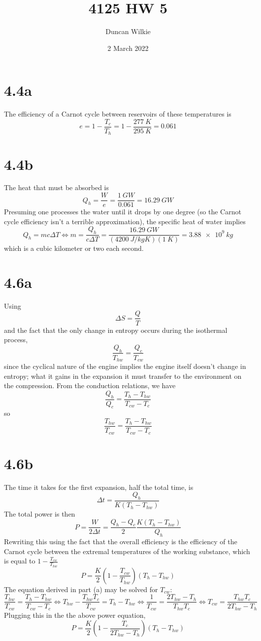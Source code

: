 \documentclass{article}
\title{4125 HW 5}
\author{Duncan Wilkie}
\date{2 March 2022}
\begin{document}
\maketitle
\section*{4.4a}
The efficiency of a Carnot cycle between reservoirs of these temperatures is
\[e=1-\frac{T_{c}}{T_{h}}=1-\frac{\SI{277}{K}}{\SI{295}{K}}=0.061\]

\section*{4.4b}
The heat that must be absorbed is
\[Q_{h}=\frac{W}{e}=\frac{\SI{1}{GW}}{0.061}=\SI{16.29}{GW}\]
Presuming one processes the water until it drops by one degree (so the Carnot cycle efficiency isn't a terrible approximation), the specific heat of water implies
\[Q_{h}=mc\Delta T\Leftrightarrow m=\frac{Q_{h}}{c\Delta T}=\frac{\SI{16.29}{GW}}{(\SI{4200}{J/kg K})(\SI{1}{K})}=\SI{3.88e9}{kg}\]
which is a cubic kilometer or two each second.

\section*{4.6a}
Using
\[\Delta S=\frac{Q}{T}\]
and the fact that the only change in entropy occurs during the isothermal process,
\[\frac{Q_{h}}{T_{hw}}=\frac{Q_{c}}{T_{cw}}\]
since the cyclical nature of the engine implies the engine itself doesn't change in entropy; what it gains in the expansion it must transfer to the environment on the compression.
From the conduction relations, we have
\[\frac{Q_{h}}{Q_{c}}=\frac{T_{h}-T_{hw}}{T_{cw}-T_{c}}\]
so
\[\frac{T_{hw}}{T_{cw}}=\frac{T_{h}-T_{hw}}{T_{cw}-T_{c}}\]
\section*{4.6b}
The time it takes for the first expansion, half the total time, is
\[\Delta t=\frac{Q_{h}}{K(T_{h}-T_{hw})}\]
The total power is then
\[P=\frac{W}{2\Delta t}=\frac{Q_{h}-Q_{c}}{2}\frac{K(T_{h}-T_{hw})}{Q_{h}}\]
Rewriting this using the fact that the overall efficiency is the efficiency of the Carnot cycle between the extremal temperatures of the working substance, which is equal to $1-\frac{T_{cw}}{T_{hw}}$
\[P=\frac{K}{2}\left( 1-\frac{T_{cw}}{T_{hw}} \right)(T_{h}-T_{hw})\]
The equation derived in part (a) may be solved for $T_{cw}$:
\[\frac{T_{hw}}{T_{cw}}=\frac{T_{h}-T_{hw}}{T_{cw}-T_{c}}\Leftrightarrow T_{hw}-\frac{T_{hw}T_{c}}{T_{cw}}=T_{h}-T_{hw}\Leftrightarrow \frac{1}{T_{cw}}=\frac{2T_{hw}-T_{h}}{T_{hw}T_{c}}\Leftrightarrow T_{cw}=\frac{T_{hw}T_{c}}{2T_{hw}-T_{h}}\]
Plugging this in the the above power equation,
\[P=\frac{K}{2}\left( 1-\frac{T_{c}}{2T_{hw}-T_{h}} \right)(T_{h}-T_{hw})\]
\end{document}

